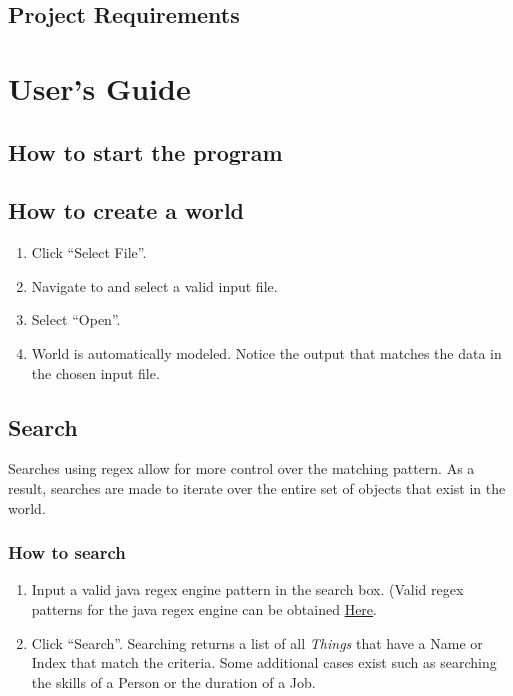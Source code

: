 \documentclass[english,man]{apa6}
\providecommand{\tightlist}{%
  \setlength{\itemsep}{0pt}\setlength{\parskip}{0pt}}
\begin{document}
\subsection{Project Requirements}\label{project-requirements}

\section{User's Guide}\label{users-guide}

\subsection{How to start the program}\label{how-to-start-the-program}

\subsection{How to create a world}\label{how-to-create-a-world}

\begin{enumerate}
\def\labelenumi{\arabic{enumi}.}
\tightlist
\item
  Click \enquote{Select File}.
\item
  Navigate to and select a valid input file.
\item
  Select \enquote{Open}.
\item
  World is automatically modeled. Notice the output that matches the
  data in the chosen input file.
\end{enumerate}

\subsection{Search}\label{search}

Searches using regex allow for more control over the matching pattern.
As a result, searches are made to iterate over the entire set of objects
that exist in the world.

\subsubsection{How to search}\label{how-to-search}

\begin{enumerate}
\def\labelenumi{\arabic{enumi}.}
\tightlist
\item
  Input a valid java regex engine pattern in the search box. (Valid
  regex patterns for the java regex engine can be obtained
  \href{http://docs.oracle.com/javase/8/docs/api/java/util/regex/Pattern.html}{Here}.
\item
  Click \enquote{Search}. Searching returns a list of all \emph{Things}
  that have a Name or Index that match the criteria. Some additional
  cases exist such as searching the skills of a Person or the duration
  of a Job.
\end{enumerate}
\end{document}
